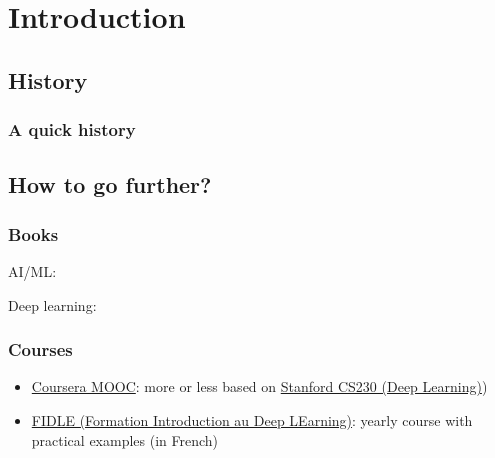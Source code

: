 \section{Introduction}

\subsection{History}

\begin{frame}
  \frametitle{A quick history}

\end{frame}

\subsection{How to go further?}

\begin{frame}
  \frametitle{Books}

  \nocite{*}

  AI/ML:
  \printbibliography[heading=none,category=general]

  Deep learning:
  \printbibliography[heading=none,category=deep_learning]
\end{frame}

\begin{frame}
  \frametitle{Courses}

  \begin{itemize}
  \item
    \href{https://www.coursera.org/specializations/machine-learning-introduction}{Coursera
      MOOC}:
    more or less based on \href{https://cs230.stanford.edu/}{Stanford CS230 (Deep Learning)})
  \item \href{https://fidle.cnrs.fr/}{FIDLE (Formation Introduction au Deep LEarning)}: yearly course with practical examples (in French)
  \end{itemize}
\end{frame}

